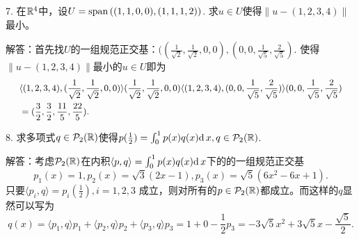 \documentclass[hyperref,]{ctexart}
\begin{document}
\bigskip

\noindent{} 7. 在\(\mathbb{R}^4\)中，设\(U=\mathrm{span}\,((1,1,0,0),(1,1,1,2))\).
求\(u\in U\)使得\(\|u-(1,2,3,4)\|\)最小。

\smallskip

\noindent{}
解答：首先找\(U\)的一组规范正交基：\(((\frac{1}{\sqrt{2}},\frac{1}{\sqrt{2}},0, 0),(0,0,\frac{1}{\sqrt{5}},\frac{2}{\sqrt{5}})\).
使得\(\|u-(1,2,3,4)\|\)最小的\(u\in U\)即为 \[\small
\begin{aligned}
&\langle (1,2,3,4),(\frac{1}{\sqrt{2}},\frac{1}{\sqrt{2}},0, 0)\rangle(\frac{1}{\sqrt{2}},\frac{1}{\sqrt{2}},0, 0) 
\langle (1,2,3,4),(0,0,\frac{1}{\sqrt{5}},\frac{2}{\sqrt{5}})\rangle(0,0,\frac{1}{\sqrt{5}},\frac{2}{\sqrt{5}})\\ 
&=(\frac32,\frac32,\frac{11}{5},\frac{22}{5}).
\end{aligned}\]

\bigskip

\noindent{} 8.
求多项式\(q\in\mathcal{P}_2(\mathbb{R})\)使得\(p(\frac12)=\int_0^1p(x)q(x)\mathrm{d}\, x,q\in\mathcal{P}_2(\mathbb{R})\).

\smallskip

\noindent{}
解答：考虑\(\mathcal{P}_2(\mathbb{R})\)在内积\(\langle p,q\rangle =\int_0^1 p(x)q(x)\mathrm{d}\, x\)下的的一组规范正交基
\[p_1(x)=1 ,p_2(x)=\sqrt{3}(2x-1),p_3(x)=\sqrt{5}(6x^2-6x+1).\]
只要\(\langle p_i,q\rangle = p_i(\frac12),i=1,2,3\)
成立，则对所有的\(p\in\mathcal{P}_2(\mathbb{R})\)都成立。而这样的\(q\)显然可以写为
\[q(x) = \langle p_1,q\rangle p_1+ \langle p_2,q\rangle p_2 +\langle p_3,q\rangle  p_3
 = 1 + 0 -\frac12 p_3 =-3\sqrt{5}x^2+3\sqrt{5}x-\frac{\sqrt{5}}{2}.\]
\end{document}
